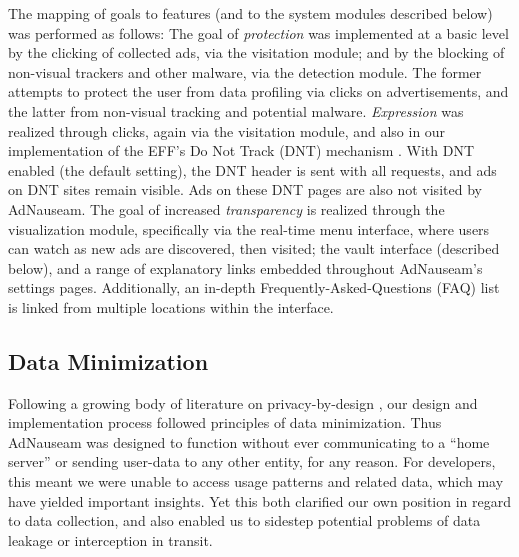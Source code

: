 \documentclass[conference]{IEEEtran}
\begin{document}
The mapping of goals to features (and to the system modules described below) was performed as follows: The goal of \emph{protection} was implemented at a basic level by the clicking of collected ads, via the visitation module; and by the blocking of non-visual trackers and other malware, via the detection module. The former attempts to protect the user from data profiling via clicks on advertisements, and the latter from non-visual tracking and potential malware. \emph{Expression} was realized through clicks, again via the visitation module, and also in our implementation of the EFF's Do Not Track (DNT) mechanism \cite{EFF-1}. With DNT enabled (the default setting), the DNT header is sent with all requests, and ads on DNT sites remain visible. Ads on these DNT pages are also not visited by AdNauseam. The goal of increased \emph{transparency} is realized through the visualization module, specifically via the real-time menu interface, where users can watch as new ads are discovered, then visited; the vault interface (described below), and a range of explanatory links embedded throughout AdNauseam's settings pages. Additionally, an in-depth Frequently-Asked-Questions (FAQ) list is linked from multiple locations within the interface.

\subsection{Data Minimization}

Following a growing body of literature on privacy-by-design \cite{Gurses-0, Hoepman, Gurses-1, Hansen, Cavoukian}, our design and implementation process followed principles of data minimization. Thus AdNauseam was designed to function without ever communicating to a “home server” or sending user-data to any other entity, for any reason. For developers, this meant we were unable to access usage patterns and related data, which may have yielded important insights. Yet this both clarified our own position in regard to data collection, and also enabled us to sidestep potential problems of data leakage or interception in transit.
\end{document}
